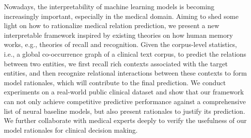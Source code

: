 Nowadays, the interpretability of machine learning models is becoming increasingly important, especially in the medical domain. Aiming to shed some light on how to rationalize medical relation prediction, we present a new interpretable framework inspired by existing theories on how human memory works, e.g., theories of recall and recognition. Given the corpus-level statistics, i.e., a global co-occurrence graph of a clinical text corpus, to predict the relations between two entities, we first recall rich contexts associated with the target entities, and then recognize relational interactions between these contexts to form model rationales, which will contribute to the final prediction. We conduct experiments on a real-world public clinical dataset and show that our framework can not only achieve competitive predictive performance against a comprehensive list of neural baseline models, but also present rationales to justify its prediction. We further collaborate with medical experts deeply to verify the usefulness of our model rationales for clinical decision making.
